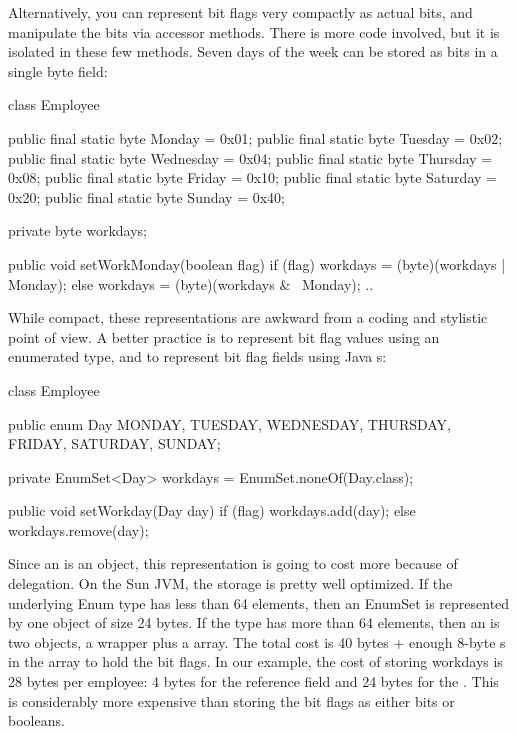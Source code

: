 Alternatively, you can represent bit flags very compactly as actual bits, and
manipulate the bits via accessor methods. There is more code involved,
but it is isolated in these few methods. Seven days of the week can be stored as
bits in a single byte field:

\begin{shortlisting}
	class Employee {
	
		public final static byte Monday = 0x01;
		public final static byte Tuesday = 0x02;
		public final static byte Wednesday = 0x04;
		public final static byte Thursday = 0x08;
		public final static byte Friday = 0x10;
		public final static byte Saturday = 0x20;
		public final static byte Sunday = 0x40;
		
		private byte workdays;
		
		public void setWorkMonday(boolean flag) {
			if (flag) {
				workdays = (byte)(workdays | Monday);
			} else {
				workdays = (byte)(workdays & ~Monday);
			}
		}
		..
   }
		       
\end{shortlisting}

While compact, these representations are awkward from a coding and
stylistic point of view. A better practice is to represent bit flag values
using an enumerated type, and to represent bit flag fields using Java
s:
\begin{shortlisting}

    class Employee {
 
		public enum Day {MONDAY, TUESDAY, WEDNESDAY, THURSDAY, FRIDAY, SATURDAY, SUNDAY};
    	
    	private EnumSet<Day> workdays = EnumSet.noneOf(Day.class);
    
   	 	public void setWorkday(Day day) {
			if (flag) {
				workdays.add(day);
			} else {
				workdays.remove(day);
			}
		}
	}
    
    
\end{shortlisting}

Since an  is an object, this representation is going to
cost more because of delegation. On the Sun JVM, the storage is pretty
well optimized. If the underlying Enum type has less than 64 elements, then an
EnumSet is represented by one object of size 24 bytes. If the  type has more
than 64 elements, then an  is two objects, a wrapper plus a
 array. The total cost is 40 bytes + enough 8-byte s
in the array to hold the bit flags. In our example, the cost of storing workdays is 28 bytes per employee:
4 bytes for the reference field and 24 bytes for the . This is considerably
more expensive than storing the bit flags as either bits or booleans. 

